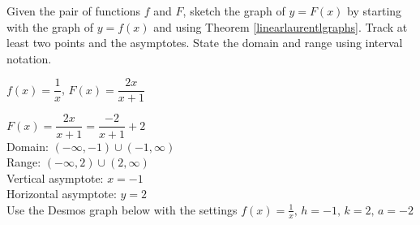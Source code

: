 \documentclass{ximera}
\begin{document}
\begin{problem}
Given the pair of functions $f$ and $F$, sketch the graph of $y=F(x)$ by starting with the graph of $y = f(x)$ and using Theorem \ref{linearlaurentlgraphs}.  Track at least two points and the asymptotes.  State the domain and range using interval notation.

$f(x) =\dfrac{1}{x}$, $F(x) = \dfrac{2x}{x+1}$

\begin{solution}
$F(x) = \dfrac{2x}{x+1} = \dfrac{-2}{x+1}+2$\\
Domain: $(-\infty, -1) \cup (-1, \infty)$ \\
Range: $(-\infty, 2) \cup (2, \infty)$ \\
Vertical asymptote:  $x = -1$\\
Horizontal asymptote:  $y = 2$ \\

Use the Desmos graph below with the settings $f(x)=\frac{1}{x},\,h=-1,\,k=2,\,a=-2$

\begin{center} 
\end{center}
    
\end{solution}

\end{problem}
\end{document}
